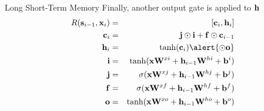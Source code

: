 \documentclass{beamer}
\begin{document}


\begin{frame}{Long Short-Term Memory}
  Finally, another output gate is applied to $\mathbf{h}$
    \begin{eqnarray*}
      R(\bold \bolds_{i-1}, \boldx_i) &=& [\boldc_i, \boldh_i]  \\
      \boldc_i &=& \boldj \odot \boldi  + \bold f \odot \bold c_{i-1}    \\
      \boldh_i &=& \tanh(\boldc_i) \alert{\odot \boldo}\\ 
      \boldi &=& \tanh(\boldx \boldW^{xi} + \boldh_{i-1}\boldW^{hi} + \boldb^i) \\
      \boldj &=& \sigma(\boldx \boldW^{xj} + \boldh_{i-1}\boldW^{hj} + \boldb^j) \\
      \boldf &=& \sigma(\boldx \boldW^{xf} + \boldh_{i-1}\boldW^{hf} + \boldb^f) \\
      \boldo &=& \tanh(\boldx \boldW^{xo} + \boldh_{i-1}\boldW^{ho} + \boldb^o) \\
    \end{eqnarray*}
\end{frame}
\end{document}
